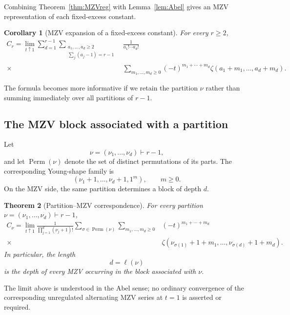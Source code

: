 \documentclass[11pt]{article}
\newtheorem{theorem}{Theorem}[section]
\newtheorem{corollary}[theorem]{Corollary}
\theoremstyle{definition}
\begin{document}
Combining Theorem~\ref{thm:MZVreg} with
Lemma~\ref{lem:Abel} gives an MZV representation of each fixed-excess
constant.

\begin{corollary}[MZV expansion of a fixed-excess constant]
\label{cor:CrMZV}
For every $r\geq2$,
\begin{align}
 C_r
 =
 \lim_{t\uparrow1}
 \sum_{d=1}^{r-1}
 \sum_{\substack{a_1,\ldots,a_d\geq2\\
                 \sum_j(a_j-1)=r-1}}
 &
 \frac{1}{a_1!\cdots a_d!}
 \nonumber\\
 {}\times
 &
 \sum_{m_1,\ldots,m_d\geq0}
 (-t)^{m_1+\cdots+m_d}
 \zeta(a_1+m_1,\ldots,a_d+m_d).
 \label{eq:CrMZV}
\end{align}
\end{corollary}

The formula becomes more informative if we retain the partition
$\nu$ rather than summing immediately over all partitions of
$r-1$.

\subsection{The MZV block associated with a partition}

Let
\[
        \nu=(\nu_1,\ldots,\nu_d)\vdash r-1,
\]
and let $\operatorname{Perm}(\nu)$ denote the set of distinct
permutations of its parts.  The corresponding Young-shape family is
\[
        (\nu_1+1,\ldots,\nu_d+1,1^m),
        \qquad m\geq0.
\]
On the MZV side, the same partition determines a block of depth $d$.

\begin{theorem}[Partition--MZV correspondence]
\label{thm:CnuMZV}
For every partition
$\nu=(\nu_1,\ldots,\nu_d)\vdash r-1$,
\begin{align}
 C_\nu
 =
 \lim_{t\uparrow1}
 \frac{1}
 {\prod_{j=1}^d(\nu_j+1)!}
 \sum_{\sigma\in\operatorname{Perm}(\nu)}
 \sum_{m_1,\ldots,m_d\geq0}
 &
 (-t)^{m_1+\cdots+m_d}
 \nonumber\\
 {}\times&
 \zeta\!\left(
 \nu_{\sigma(1)}+1+m_1,\ldots,
 \nu_{\sigma(d)}+1+m_d
 \right).
 \label{eq:CnuMZV}
\end{align}
In particular, the length
\[
        d=\ell(\nu)
\]
is the depth of every MZV occurring in the block associated with
$\nu$.
\end{theorem}

The limit above is understood in the Abel sense; no ordinary
convergence of the corresponding unregulated alternating MZV series
at $t=1$ is asserted or required.
\end{document}
